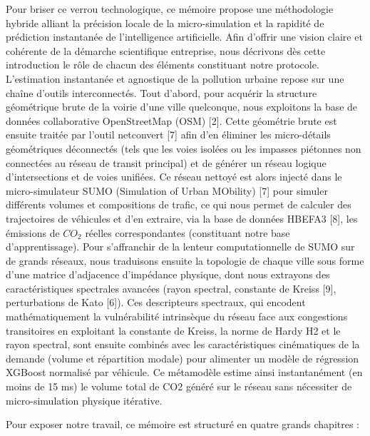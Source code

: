 \documentclass[10pt, a4paper]{article}
\begin{document}
Pour briser ce verrou technologique, ce mémoire propose une méthodologie
hybride alliant la précision locale de la micro-simulation et la
rapidité de prédiction instantanée de l'intelligence artificielle. Afin
d'offrir une vision claire et cohérente de la démarche scientifique
entreprise, nous décrivons dès cette introduction le rôle de chacun des
éléments constituant notre protocole. L'estimation instantanée et
agnostique de la pollution urbaine repose sur une chaîne d'outils
interconnectés. Tout d'abord, pour acquérir la structure géométrique
brute de la voirie d'une ville quelconque, nous exploitons la base de
données collaborative OpenStreetMap (OSM) {[}2{]}. Cette géométrie brute
est ensuite traitée par l'outil netconvert {[}7{]} afin d'en éliminer
les micro-détails géométriques déconnectés (tels que les voies isolées
ou les impasses piétonnes non connectées au réseau de transit principal)
et de générer un réseau logique d'intersections et de voies unifiées. Ce
réseau nettoyé est alors injecté dans le micro-simulateur SUMO
(Simulation of Urban MObility) {[}7{]} pour simuler différents volumes
et compositions de trafic, ce qui nous permet de calculer des
trajectoires de véhicules et d'en extraire, via la base de données
HBEFA3 {[}8{]}, les émissions de \(CO_2\) réelles correspondantes
(constituant notre base d'apprentissage). Pour s'affranchir de la
lenteur computationnelle de SUMO sur de grands réseaux, nous traduisons
ensuite la topologie de chaque ville sous forme d'une matrice
d'adjacence d'impédance physique, dont nous extrayons des
caractéristiques spectrales avancées (rayon spectral, constante de
Kreiss {[}9{]}, perturbations de Kato {[}6{]}). Ces descripteurs
spectraux, qui encodent mathématiquement la vulnérabilité intrinsèque du
réseau face aux congestions transitoires en exploitant la constante de
Kreiss, la norme de Hardy H2 et le rayon spectral, sont ensuite combinés
avec les caractéristiques cinématiques de la demande (volume et
répartition modale) pour alimenter un modèle de régression XGBoost
normalisé par véhicule. Ce métamodèle estime ainsi instantanément (en
moins de 15 ms) le volume total de CO2 généré sur le réseau sans
nécessiter de micro-simulation physique itérative.

Pour exposer notre travail, ce mémoire est structuré en quatre grands
chapitres :
\end{document}
